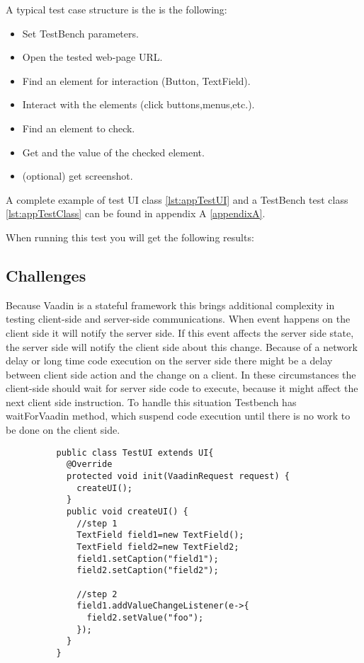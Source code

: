 A typical test case structure is the is the following:
\begin{itemize}
  \item Set TestBench parameters.
  \item Open the tested web-page URL.
  \item Find an element for interaction (Button, TextField).
  \item Interact with the elements (click buttons,menus,etc.).
  \item Find an element to check.
  \item Get and the value of the checked element.
  \item (optional) get screenshot.
\end{itemize}

A complete example of test UI class \ref{lst:appTestUI}  and a TestBench test
class \ref{lst:appTestClass} can be found in appendix A \ref{appendixA}.
	
	When running this test you will get the following results:
\iffalse
	\subsection {Challenges}
	Because Vaadin is a stateful framework this brings additional complexity in
	testing client-side and server-side communications. When event happens on the client side 
	it will notify the server side. If this event affects the server side state, the
	server side will notify the client side about this change.
	 Because of a network delay or long time code execution on the server side there might be a delay between 
	 client side action and the change on a client.  
	 In these circumstances the client-side should wait for server side code to execute,
	  because it might affect the next client side instruction.
	  To handle this situation Testbench has waitForVaadin method, which suspend code execution until 
	  there is no work to be done on the client side.
	      
	  
	    \lstset{language=Java}
	    \begin{lstlisting}
	      public class TestUI extends UI{
	        @Override
	        protected void init(VaadinRequest request) {
	          createUI();
	        }
	        public void createUI() {
	          //step 1 
	          TextField field1=new TextField();
	          TextField field2=new TextField2;
	          field1.setCaption("field1");
	          field2.setCaption("field2");
	          
	          //step 2
	          field1.addValueChangeListener(e->{
	            field2.setValue("foo");
	          });
	        }
	      }
	    \end{lstlisting}  
	    
